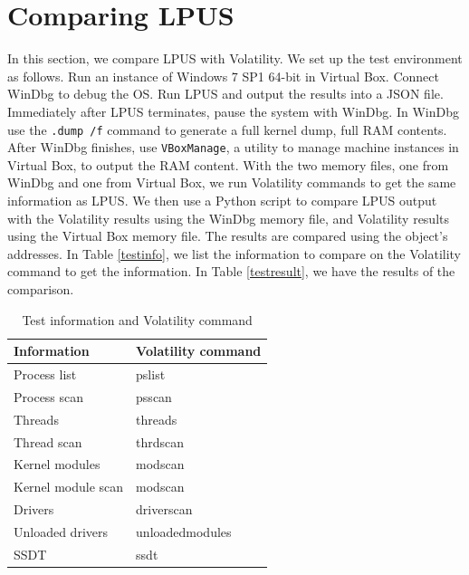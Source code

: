 \section[Comparing LPUS]{Comparing LPUS}

In this section, we compare LPUS with Volatility. We set up the test
environment as follows. Run an instance of Windows 7 SP1 64-bit in Virtual Box.
Connect WinDbg to debug the OS. Run LPUS and output the results into a JSON
file.  Immediately after LPUS terminates, pause the system with WinDbg. In
WinDbg use the \texttt{.dump /f} command to generate a full kernel dump, full
RAM contents. After WinDbg finishes, use \texttt{VBoxManage}, a utility to
manage machine instances in Virtual Box, to output the RAM content. With the
two memory files, one from WinDbg and one from Virtual Box, we run Volatility
commands to get the same information as LPUS. We then use a Python script to
compare LPUS output with the Volatility results using the WinDbg memory file,
and Volatility results using the Virtual Box memory file. The results are
compared using the object's addresses. In Table \ref{testinfo}, we list the
information to compare on the Volatility command to get the information. In
Table \ref{testresult}, we have the results of the comparison.


\begin{table}[t]
\centering
\begin{tabular}{ll}
\hline
  Information         & Volatility command \\ \hline
  Process list        & pslist             \\
  Process scan        & psscan             \\
  Threads             & threads            \\
  Thread scan         & thrdscan           \\
  Kernel modules      & modscan            \\
  Kernel module scan  & modscan            \\
  Drivers             & driverscan         \\
  Unloaded drivers    & unloadedmodules    \\
  SSDT                & ssdt               \\
\hline
\end{tabular}
\caption{Test information and Volatility command}
\label{tab:testinfo}
\end{table}


